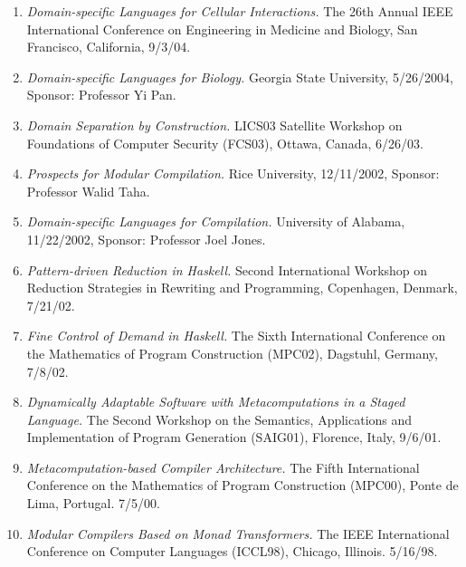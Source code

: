 \documentclass[12pt]{article} %
\begin{document}
\begin{enumerate}[leftmargin=0mm]
\item{\it Domain-specific Languages for Cellular Interactions.} The 26th Annual IEEE International Conference on Engineering in Medicine and Biology, San Francisco, California, 9/3/04.

\item{\it Domain-specific Languages for Biology.} Georgia State
  University, 5/26/2004, Sponsor: Professor Yi Pan.




\item{\it Domain Separation by Construction.} LICS03 Satellite Workshop on Foundations of Computer Security (FCS03), Ottawa, Canada, 6/26/03. 

\item{\it Prospects for Modular Compilation.}
Rice University, 12/11/2002, Sponsor: Professor Walid Taha.

\item{\it Domain-specific Languages for Compilation.}
University of Alabama, 11/22/2002, Sponsor: Professor Joel Jones.

\item{\it Pattern-driven Reduction in Haskell.} Second International Workshop on Reduction Strategies in Rewriting and Programming, Copenhagen, Denmark, 7/21/02.

\item{\emph{Fine Control of Demand in Haskell.}} The Sixth International Conference on the Mathematics of Program Construction (MPC02), Dagstuhl, Germany, 7/8/02. 

\item{\it Dynamically Adaptable Software with Metacomputations in a Staged Language.} The Second Workshop on the Semantics, Applications and Implementation of Program Generation (SAIG01), Florence, Italy, 9/6/01. 

\item{\it Metacomputation-based Compiler Architecture.} The Fifth International Conference on the Mathematics of Program Construction (MPC00), Ponte de Lima, Portugal. 7/5/00. 

\item{\it Modular Compilers Based on Monad Transformers.} The IEEE International Conference on Computer Languages (ICCL98), Chicago, Illinois. 5/16/98.

\end{enumerate}
\end{document}
